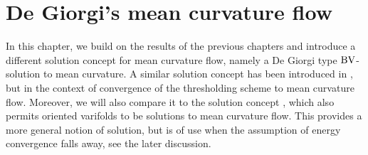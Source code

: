 \chapter{De Giorgi's mean curvature flow}
\label{chapter_de_giorgis_mcf}

In this chapter, we build on the results of the previous chapters and introduce 
a different solution concept for mean curvature flow, namely a De Giorgi type $ 
\operatorname{BV} 
$-solution to mean curvature. A similar solution concept has been introduced in 
\cite[Def.~1]{laux_lelmi_de_giorgis_inequality_for_the_threshholding_scheme}, 
but in the context of convergence of the thresholding scheme to mean curvature 
flow. Moreover, we will also compare it to the solution concept 
\cite[Def.~1]{hensel_laux_varifold_solution_concept_for_mean_curvature_flow}, 
which also permits oriented varifolds to be solutions to mean curvature flow. 
This provides a more general notion of solution, but is of use when the 
assumption of energy convergence falls away, see the later discussion.




